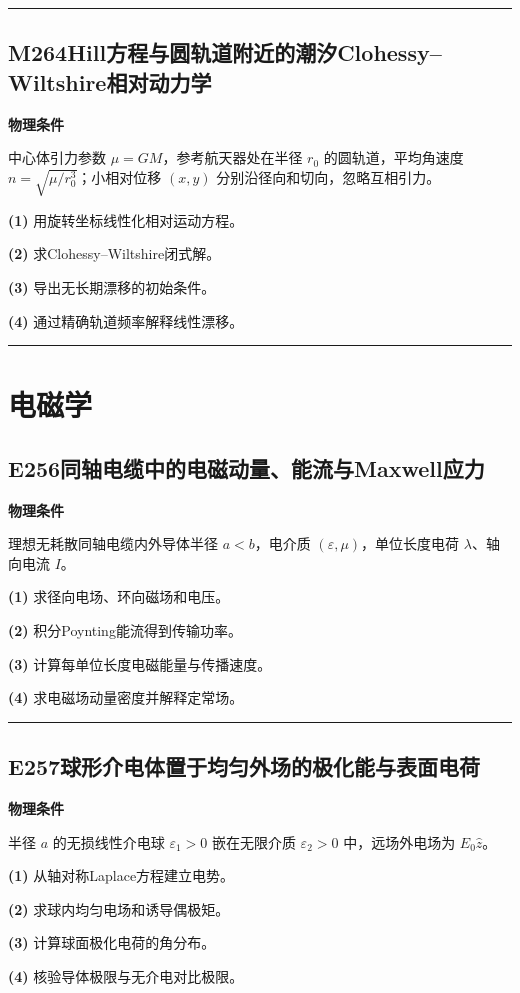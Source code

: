 \documentclass[UTF8,a4paper,11pt,oneside,openany]{ctexbook}
\begin{document}
\par\bigskip\hrule\bigskip
\section*{M264\quad Hill方程与圆轨道附近的潮汐Clohessy–Wiltshire相对动力学}
\textbf{物理条件}\par 中心体引力参数 \(\mu=GM\)，参考航天器处在半径 \(r_0\) 的圆轨道，平均角速度 \(n=\sqrt{\mu/r_0^3}\)；小相对位移 \((x,y)\) 分别沿径向和切向，忽略互相引力。
\par\noindent\textbf{(1)} 用旋转坐标线性化相对运动方程。
\par\noindent\textbf{(2)} 求Clohessy–Wiltshire闭式解。
\par\noindent\textbf{(3)} 导出无长期漂移的初始条件。
\par\noindent\textbf{(4)} 通过精确轨道频率解释线性漂移。

\par\bigskip\hrule\bigskip
\chapter{电磁学}
\section*{E256\quad 同轴电缆中的电磁动量、能流与Maxwell应力}
\textbf{物理条件}\par 理想无耗散同轴电缆内外导体半径 \(a<b\)，电介质 \((\varepsilon,\mu)\)，单位长度电荷 \(\lambda\)、轴向电流 \(I\)。
\par\noindent\textbf{(1)} 求径向电场、环向磁场和电压。
\par\noindent\textbf{(2)} 积分Poynting能流得到传输功率。
\par\noindent\textbf{(3)} 计算每单位长度电磁能量与传播速度。
\par\noindent\textbf{(4)} 求电磁场动量密度并解释定常场。

\par\bigskip\hrule\bigskip
\section*{E257\quad 球形介电体置于均匀外场的极化能与表面电荷}
\textbf{物理条件}\par 半径 \(a\) 的无损线性介电球 \(\varepsilon_1>0\) 嵌在无限介质 \(\varepsilon_2>0\) 中，远场外电场为 \(E_0\hat z\)。
\par\noindent\textbf{(1)} 从轴对称Laplace方程建立电势。
\par\noindent\textbf{(2)} 求球内均匀电场和诱导偶极矩。
\par\noindent\textbf{(3)} 计算球面极化电荷的角分布。
\par\noindent\textbf{(4)} 核验导体极限与无介电对比极限。
\end{document}
